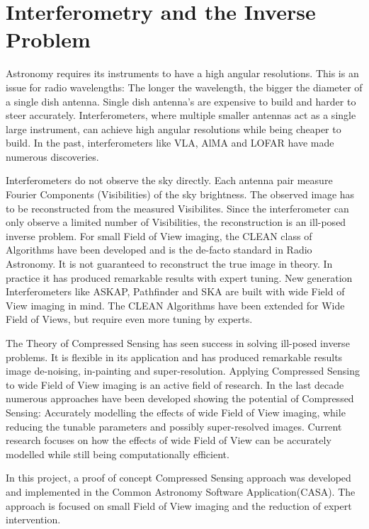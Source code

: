 \section{Interferometry and the Inverse Problem}\label{intro}
Astronomy requires its instruments to have a high angular resolutions. This is an issue for radio wavelengths: The longer the wavelength, the bigger the diameter of a single dish antenna. Single dish antenna's are expensive to build and harder to steer accurately. Interferometers, where multiple smaller antennas act as a single large instrument, can achieve high angular resolutions while being cheaper to build. In the past, interferometers like VLA, AlMA and LOFAR have made numerous discoveries.

Interferometers do not observe the sky directly. Each antenna pair measure Fourier Components (Visibilities) of the sky brightness. The observed image has to be reconstructed from the measured Visibilites. Since the interferometer can only observe a limited number of Visibilities, the reconstruction is an ill-posed inverse problem. For small Field of View imaging, the CLEAN class of Algorithms\cite{hogbom1974aperture}\cite{schwab1984relaxing}\cite{rich2008multi}\cite{rau2011multi} have been developed and is the de-facto standard in Radio Astronomy. It is not guaranteed to reconstruct the true image in theory. In practice it has produced remarkable results with expert tuning. New generation Interferometers like ASKAP, Pathfinder and SKA are built with wide Field of View imaging in mind. The CLEAN Algorithms have been extended for Wide Field of Views, but require even more tuning by experts. 

The Theory of Compressed Sensing\cite{candes2006robust}\cite{donoho2006compressed} has seen success in solving ill-posed inverse problems. It is flexible in its application and has produced remarkable results image de-noising\cite{many}, in-painting\cite{many} and super-resolution\cite{many}. Applying Compressed Sensing to wide Field of View imaging is an active field of research. In the last decade numerous approaches have been developed showing the potential of Compressed Sensing: Accurately modelling the effects of wide Field of View imaging, while reducing the tunable parameters and possibly super-resolved images\cite{garsden2015lofar}. Current research focuses on how the effects of wide Field of View can be accurately modelled while still being computationally efficient.

In this project, a proof of concept Compressed Sensing approach was developed and implemented in the Common Astronomy Software Application(CASA). The approach is focused on small Field of View imaging and the reduction of expert intervention.

